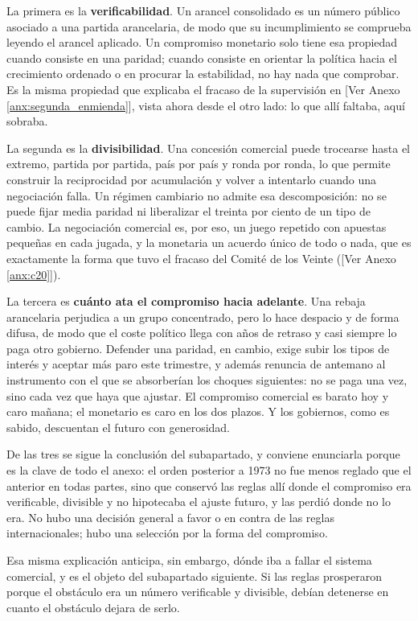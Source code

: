 \documentclass[10pt,a4paper]{article}
\newcommand{\authorfont}[1]{{\fontfamily{EBGaramond-TLF}\selectfont #1}}
\newcounter{anexo}
\begin{document}
La primera es la \textbf{verificabilidad}. Un arancel consolidado es un número público asociado a una partida arancelaria, de modo que su incumplimiento se comprueba leyendo el arancel aplicado. Un compromiso monetario solo tiene esa propiedad cuando consiste en una paridad; cuando consiste en orientar la política hacia el crecimiento ordenado o en procurar la estabilidad, no hay nada que comprobar. Es la misma propiedad que explicaba el fracaso de la supervisión en [\authorfont{Ver Anexo \ref{anx:segunda_enmienda}}], vista ahora desde el otro lado: lo que allí faltaba, aquí sobraba.

La segunda es la \textbf{divisibilidad}. Una concesión comercial puede trocearse hasta el extremo, partida por partida, país por país y ronda por ronda, lo que permite construir la reciprocidad por acumulación y volver a intentarlo cuando una negociación falla. Un régimen cambiario no admite esa descomposición: no se puede fijar media paridad ni liberalizar el treinta por ciento de un tipo de cambio. La negociación comercial es, por eso, un juego repetido con apuestas pequeñas en cada jugada, y la monetaria un acuerdo único de todo o nada, que es exactamente la forma que tuvo el fracaso del Comité de los Veinte ([\authorfont{Ver Anexo \ref{anx:c20}}]).

La tercera es \textbf{cuánto ata el compromiso hacia adelante}. Una rebaja arancelaria perjudica a un grupo concentrado, pero lo hace despacio y de forma difusa, de modo que el coste político llega con años de retraso y casi siempre lo paga otro gobierno. Defender una paridad, en cambio, exige subir los tipos de interés y aceptar más paro este trimestre, y además renuncia de antemano al instrumento con el que se absorberían los choques siguientes: no se paga una vez, sino cada vez que haya que ajustar. El compromiso comercial es barato hoy y caro mañana; el monetario es caro en los dos plazos. Y los gobiernos, como es sabido, descuentan el futuro con generosidad.

De las tres se sigue la conclusión del subapartado, y conviene enunciarla porque es la clave de todo el anexo: el orden posterior a 1973 no fue menos reglado que el anterior en todas partes, sino que conservó las reglas allí donde el compromiso era verificable, divisible y no hipotecaba el ajuste futuro, y las perdió donde no lo era. No hubo una decisión general a favor o en contra de las reglas internacionales; hubo una selección por la forma del compromiso.

Esa misma explicación anticipa, sin embargo, dónde iba a fallar el sistema comercial, y es el objeto del subapartado siguiente. Si las reglas prosperaron porque el obstáculo era un número verificable y divisible, debían detenerse en cuanto el obstáculo dejara de serlo.
\end{document}
